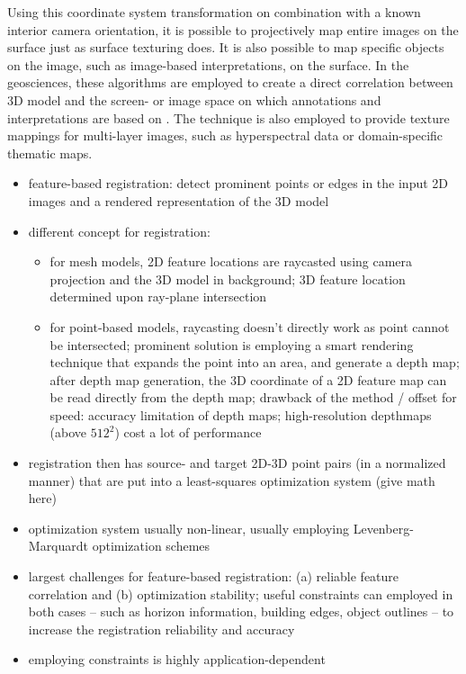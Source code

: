 \documentclass[review]{elsarticle}
\begin{document}
Using this coordinate system transformation on combination with a known interior camera orientation, it is possible to projectively map entire images on the surface just as surface texturing does. It is also possible to map specific objects on the image, such as image-based interpretations, on the surface. In the geosciences, these algorithms are employed to create a direct correlation between 3D model and the screen- or image space on which annotations and interpretations are based on \cite{Kehl2016}. The technique is also employed to provide texture mappings for multi-layer images, such as hyperspectral data or domain-specific thematic maps.

\begin{itemize}
\item feature-based registration: detect prominent points or edges in the input 2D images and a rendered representation of the 3D model
\item different concept for registration: 
\begin{itemize}
\item for mesh models, 2D feature locations are raycasted using camera projection and the 3D model in background; 3D feature location determined upon ray-plane intersection
\item for point-based models, raycasting doesn't directly work as point cannot be intersected; prominent solution is employing a smart rendering technique that expands the point into an area, and generate a depth map; after depth map generation, the 3D coordinate of a 2D feature map can be read directly from the depth map; drawback of the method / offset for speed: accuracy limitation of depth maps; high-resolution depthmaps (above $512^2$) cost a lot of performance
\end{itemize}
\item registration then has source- and target 2D-3D point pairs (in a normalized manner) that are put into a least-squares optimization system (give math here)
\item optimization system usually non-linear, usually employing Levenberg-Marquardt optimization schemes \cite{Kehl2016_3DNO}
\item largest challenges for feature-based registration: (a) reliable feature correlation and (b) optimization stability; useful constraints can employed in both cases -- such as horizon information, building edges, object outlines -- to increase the registration reliability and accuracy
\item employing constraints is highly application-dependent
\end{itemize}
\end{document}
